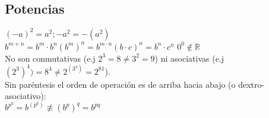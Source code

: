 \subsection{Potencias}
$ (-a)^2 = a^2; -a^2 = -(a^2)$ \\
$b^{m + n} = b^m \cdot b^n
\left(b^m\right)^n = b^{m \cdot n} 
(b \cdot c)^n = b^n \cdot c^n$
$ 0^0 \notin \mathbb{R}$\\

No son conmutativas (e.j $2^3 = 8 \neq 3^2 = 9$) ni asociativas (e.j $(2^3)^4) = 8^4 \neq 2^{(3^4)} = 2^{81}$).\\

Sin paréntesis el orden de operación es de arriba hacia abajo (o dextro-asociativo):\\
$b^{p^q} = b^{\left(p^q\right)} \not\equiv \left(b^p\right)^q = b^{p q}$\\
